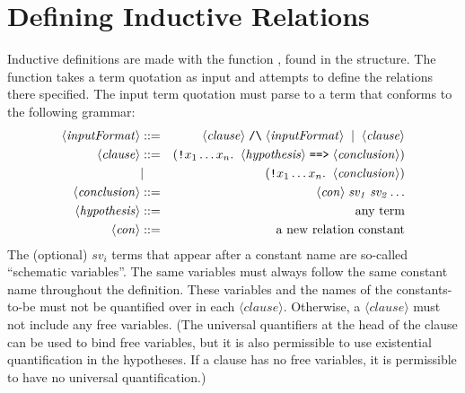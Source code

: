 \section{Defining Inductive Relations}

Inductive definitions are made with the function , found
in the  structure.  The  function takes a
term quotation as input and attempts to define the relations there
specified.  The input term quotation must parse to a term that
conforms to the following grammar:
\newcommand{\nonterm}[1]{\ensuremath{\langle\mathit{#1}\rangle}}
\begin{eqnarray*}
   \nonterm{inputFormat} &::=& \nonterm{clause} \;\holtxt{/\bk}\; \nonterm{inputFormat} \;\;|\;\; \nonterm{clause}\\
   \nonterm{clause}       &::=& (\holtxt{!}x_1 \dots
   x_n. \;\;\nonterm{hypothesis} \;\holtxt{==>}
   \;\nonterm{conclusion})\\
   &|& (\holtxt{!}x_1\dots x_n.\;\;\nonterm{conclusion})\\
   \nonterm{conclusion}   &::=& \nonterm{con} \;\mathit{sv_1}\; \mathit{sv_2} \dots\\
   \nonterm{hypothesis}   &::=& \mbox{any term}\\
   \nonterm{con}          &::=& \mbox{a new relation constant}
\end{eqnarray*}
The (optional) $\mathit{sv}_i$ terms that appear after a constant name are
so-called ``schematic variables''.  The same variables must always
follow the same constant name throughout the definition.  These
variables and the names of the constants-to-be must not be quantified
over in each {\nonterm{clause}}.  Otherwise, a {\nonterm{clause}} must
not include any free variables.  (The universal quantifiers at the
head of the clause can be used to bind free variables, but it is also
permissible to use existential quantification in the hypotheses.  If a
clause has no free variables, it is permissible to have no universal
quantification.)

